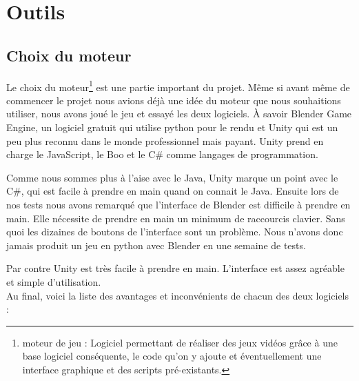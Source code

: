 \documentclass[a4paper,11pt]{myreport}
\begin{document}
\section{Outils}
\subsection{Choix du moteur}
\par Le choix du moteur\footnote{moteur de jeu : Logiciel permettant de réaliser des jeux vidéos grâce à une base logiciel conséquente, le code qu'on y ajoute et éventuellement une interface graphique et des scripts pré-existants.} est une partie important du projet. Même si avant même de commencer le projet nous avions déjà une idée du moteur que nous souhaitions utiliser, nous avons joué le jeu et essayé les deux logiciels. \`A savoir Blender Game Engine, un logiciel gratuit qui utilise python pour le rendu et Unity qui est un peu plus reconnu dans le monde professionnel mais payant. Unity prend en charge le JavaScript, le Boo et le C\# comme langages de programmation.

\par Comme nous sommes plus à l'aise avec le Java, Unity marque un point avec le C\#, qui est facile à prendre en main quand on connait le Java. Ensuite lors de nos tests nous avons remarqué que l'interface de Blender est difficile à prendre en main. Elle nécessite de prendre en main un minimum de raccourcis clavier. Sans quoi les dizaines de boutons de l'interface sont un problème. Nous n'avons donc jamais produit un jeu en python avec Blender en une semaine de tests.
\par Par contre Unity est très facile à prendre en main. L'interface est assez agréable et simple d'utilisation.
\\Au final, voici la liste des avantages et inconvénients de chacun des deux logiciels :
\end{document}

